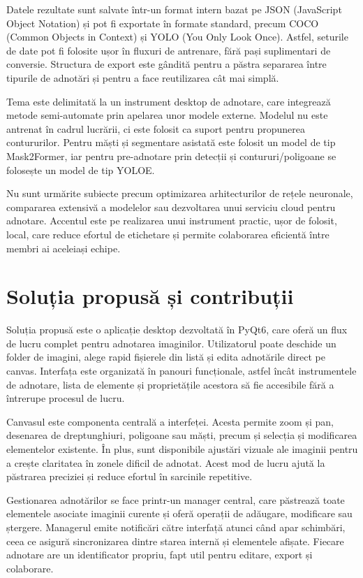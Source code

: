 Datele rezultate sunt salvate într-un format intern bazat pe JSON (JavaScript Object Notation) și pot fi exportate în formate standard, precum COCO (Common Objects in Context) și YOLO (You Only Look Once). Astfel, seturile de date pot fi folosite ușor în fluxuri de antrenare, fără pași suplimentari de conversie. Structura de export este gândită pentru a păstra separarea între tipurile de adnotări și pentru a face reutilizarea cât mai simplă.

Tema este delimitată la un instrument desktop de adnotare, care integrează metode semi-automate prin apelarea unor modele externe. Modelul nu este antrenat în cadrul lucrării, ci este folosit ca suport pentru propunerea contururilor. Pentru măști și segmentare asistată este folosit un model de tip Mask2Former, iar pentru pre-adnotare prin detecții și contururi/poligoane se folosește un model de tip YOLOE.

Nu sunt urmărite subiecte precum optimizarea arhitecturilor de rețele neuronale, compararea extensivă a modelelor sau dezvoltarea unui serviciu cloud pentru adnotare. Accentul este pe realizarea unui instrument practic, ușor de folosit, local, care reduce efortul de etichetare și permite colaborarea eficientă între membri ai aceleiași echipe.

\section{Soluția propusă și contribuții}
Soluția propusă este o aplicație desktop dezvoltată în PyQt6, care oferă un flux de lucru complet pentru adnotarea imaginilor. Utilizatorul poate deschide un folder de imagini, alege rapid fișierele din listă și edita adnotările direct pe canvas. Interfața este organizată în panouri funcționale, astfel încât instrumentele de adnotare, lista de elemente și proprietățile acestora să fie accesibile fără a întrerupe procesul de lucru.

Canvasul este componenta centrală a interfeței. Acesta permite zoom și pan, desenarea de dreptunghiuri, poligoane sau măști, precum și selecția și modificarea elementelor existente. În plus, sunt disponibile ajustări vizuale ale imaginii pentru a crește claritatea în zonele dificil de adnotat. Acest mod de lucru ajută la păstrarea preciziei și reduce efortul în sarcinile repetitive.

Gestionarea adnotărilor se face printr-un manager central, care păstrează toate elementele asociate imaginii curente și oferă operații de adăugare, modificare sau ștergere. Managerul emite notificări către interfață atunci când apar schimbări, ceea ce asigură sincronizarea dintre starea internă și elementele afișate. Fiecare adnotare are un identificator propriu, fapt util pentru editare, export și colaborare.

